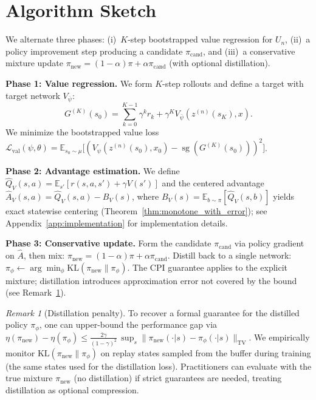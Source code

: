 \documentclass{article}
\theoremstyle{plain}
\theoremstyle{definition}
\theoremstyle{remark}
\newtheorem{remark}[theorem]{Remark}
\newcommand{\shortonly}[1]{#1}
\newcommand{\shortonly}[1]{}
\newcommand{\E}{\mathbb{E}}
\newcommand{\KL}{\mathrm{KL}}
\newcommand{\sg}{\operatorname{sg}}
\begin{document}
\shortonly{
\section{Algorithm Sketch}
\label{sec:algorithm}
We alternate three phases: (i)~$K$-step bootstrapped value regression for $U_n$, (ii)~a policy improvement step producing a candidate $\pi_{\mathrm{cand}}$, and (iii)~a conservative mixture update $\pi_{\mathrm{new}}\!=\!(1{-}\alpha)\pi+\alpha\pi_{\mathrm{cand}}$ (with optional distillation).

\textbf{Phase 1: Value regression.}
We form $K$-step rollouts and define a target with target network $V_{\bar\psi}$:
\begin{equation}
G^{(K)}(s_0)
=
\sum_{k=0}^{K-1}\gamma^k r_k
+
\gamma^K V_{\bar\psi}(z^{(n)}(s_K),x).
\label{eq:GK_def}
\end{equation}
We minimize the bootstrapped value loss
$\mathcal{L}_{\mathrm{val}}(\psi,\theta)
=
\E_{s_0\sim\mu}\bigl[
   (V_\psi(z^{(n)}(s_0),x_0)
   -
   \sg(G^{(K)}(s_0)))^2
\bigr]$.

\textbf{Phase 2: Advantage estimation.}
We define $\widehat Q_V(s,a) = \E_{s'}[r(s,a,s') + \gamma V(s')]$ and the centered advantage $\widehat A_V(s,a) = \widehat Q_V(s,a) - B_V(s)$, where $B_V(s)=\E_{b\sim\pi}[\widehat Q_V(s,b)]$ yields exact statewise centering (Theorem~\ref{thm:monotone_with_error}); see Appendix~\ref{app:implementation} for implementation details.

\textbf{Phase 3: Conservative update.}
Form the candidate $\pi_{\mathrm{cand}}$ via policy gradient on $\widehat A$, then mix:
$\pi_{\mathrm{new}}=(1-\alpha)\pi+\alpha\pi_{\mathrm{cand}}$.
Distill back to a single network: $\pi_\phi \gets \arg\min_\phi \KL(\pi_{\mathrm{new}} \| \pi_\phi)$.
The CPI guarantee applies to the explicit mixture; distillation introduces approximation error not covered by the bound (see Remark~\ref{rem:distillation_penalty}).

\begin{remark}[Distillation penalty]
\label{rem:distillation_penalty}
To recover a formal guarantee for the distilled policy $\pi_\phi$, one can upper-bound the performance gap via
$\eta(\pi_{\mathrm{new}}) - \eta(\pi_\phi) \le \tfrac{2\gamma}{(1-\gamma)^2}\,\sup_{s}\|\pi_{\mathrm{new}}(\cdot|s) - \pi_\phi(\cdot|s)\|_{\mathrm{TV}}$.
We empirically monitor $\KL(\pi_{\mathrm{new}}\|\pi_\phi)$ on replay states sampled from the buffer during training (the same states used for the distillation loss).
Practitioners can evaluate with the true mixture $\pi_{\mathrm{new}}$ (no distillation) if strict guarantees are needed, treating distillation as optional compression.
\end{remark}

}
\end{document}
